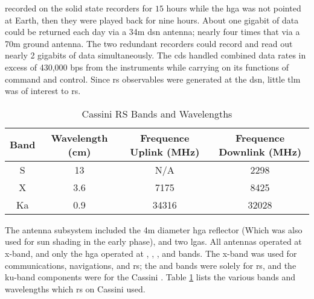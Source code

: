 \documentclass[crop=false,class=article,oneside]{standalone}
\begin{document}
            recorded on the solid state recorders for $15$
            hours while the \gls{hga} was not pointed at
            Earth, then they were played back for nine
            hours. About one gigabit of data could be
            returned each day via a 34m \gls{dsn}
            antenna; nearly four times that via a 70m
            ground antenna. The two redundant recorders
            could record and read out nearly 2 gigabits
            of data simultaneously. The \gls{cds} handled
            combined data rates in excess of 430,000
            \gls{bps} from the instruments while carrying
            on its functions of command and control.
            Since \gls{rs} observables were generated at
            the \gls{dsn}, little \gls{tlm} was of interest
            to \gls{rs}.
            \begin{table}[H]
                \centering
                \caption{Cassini RS Bands and Wavelengths}
                \label{tab:usr_band_wav}
                \footnotesize
                \begin{tabular}{|c|c|c|c|}
                    \hline
                    Band&Wavelength (cm)
                    &Frequence Uplink (MHz)
                    &Frequence Downlink (MHz) \\
                    \hline
                    S&13& N/A&2298\\
                    X&3.6&7175&8425\\
                    Ka&0.9&34316&32028\\
                    \hline
                \end{tabular}
            \end{table}
            The antenna subsystem included the 4m diameter
            \gls{hga} reflector (Which was also used for
            sun shading in the early
             phase),
            and two \glspl{lga}. All antennas operated
            at \gls{x-band}, and only the \gls{hga}
            operated at ,
            , ,
            and  bands.
            The \gls{x-band} was used for communications,
            navigations, and \gls{rs};
            the  and
             bands were solely for
            \gls{rs}, and the \gls{ku-band} components were
            for the Cassini .
            Table \ref{tab:usr_band_wav} lists the
            various bands and wavelengths which \gls{rs}
            on Cassini used.
\end{document}
